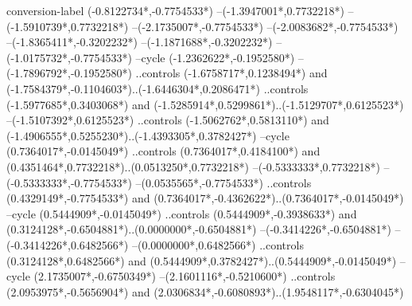 {\begin{scope}[x=1mm,y=1mm,line width=\SCstroke mm,line cap=round,line join=round]
    
    \begin{SCpart}{conversion-label}
       ({-0.8122734*\SCscale},{-0.7754533*\SCscale})
      --({-1.3947001*\SCscale},{0.7732218*\SCscale})
      --({-1.5910739*\SCscale},{0.7732218*\SCscale})
      --({-2.1735007*\SCscale},{-0.7754533*\SCscale})
      --({-2.0083682*\SCscale},{-0.7754533*\SCscale})
      --({-1.8365411*\SCscale},{-0.3202232*\SCscale})
      --({-1.1871688*\SCscale},{-0.3202232*\SCscale})
      --({-1.0175732*\SCscale},{-0.7754533*\SCscale})
      --cycle
      ({-1.2362622*\SCscale},{-0.1952580*\SCscale})
      --({-1.7896792*\SCscale},{-0.1952580*\SCscale})
      ..controls ({-1.6758717*\SCscale},{0.1238494*\SCscale}) and ({-1.7584379*\SCscale},{-0.1104603*\SCscale})..({-1.6446304*\SCscale},{0.2086471*\SCscale})
      ..controls ({-1.5977685*\SCscale},{0.3403068*\SCscale}) and ({-1.5285914*\SCscale},{0.5299861*\SCscale})..({-1.5129707*\SCscale},{0.6125523*\SCscale})
      --({-1.5107392*\SCscale},{0.6125523*\SCscale})
      ..controls ({-1.5062762*\SCscale},{0.5813110*\SCscale}) and ({-1.4906555*\SCscale},{0.5255230*\SCscale})..({-1.4393305*\SCscale},{0.3782427*\SCscale})
      --cycle
      ({0.7364017*\SCscale},{-0.0145049*\SCscale})
      ..controls ({0.7364017*\SCscale},{0.4184100*\SCscale}) and ({0.4351464*\SCscale},{0.7732218*\SCscale})..({0.0513250*\SCscale},{0.7732218*\SCscale})
      --({-0.5333333*\SCscale},{0.7732218*\SCscale})
      --({-0.5333333*\SCscale},{-0.7754533*\SCscale})
      --({0.0535565*\SCscale},{-0.7754533*\SCscale})
      ..controls ({0.4329149*\SCscale},{-0.7754533*\SCscale}) and ({0.7364017*\SCscale},{-0.4362622*\SCscale})..({0.7364017*\SCscale},{-0.0145049*\SCscale})
      --cycle
      ({0.5444909*\SCscale},{-0.0145049*\SCscale})
      ..controls ({0.5444909*\SCscale},{-0.3938633*\SCscale}) and ({0.3124128*\SCscale},{-0.6504881*\SCscale})..({0.0000000*\SCscale},{-0.6504881*\SCscale})
      --({-0.3414226*\SCscale},{-0.6504881*\SCscale})
      --({-0.3414226*\SCscale},{0.6482566*\SCscale})
      --({0.0000000*\SCscale},{0.6482566*\SCscale})
      ..controls ({0.3124128*\SCscale},{0.6482566*\SCscale}) and ({0.5444909*\SCscale},{0.3782427*\SCscale})..({0.5444909*\SCscale},{-0.0145049*\SCscale})
      --cycle
      ({2.1735007*\SCscale},{-0.6750349*\SCscale})
      --({2.1601116*\SCscale},{-0.5210600*\SCscale})
      ..controls ({2.0953975*\SCscale},{-0.5656904*\SCscale}) and ({2.0306834*\SCscale},{-0.6080893*\SCscale})..({1.9548117*\SCscale},{-0.6304045*\SCscale})

\end{SCpart}
\end{scope}}

